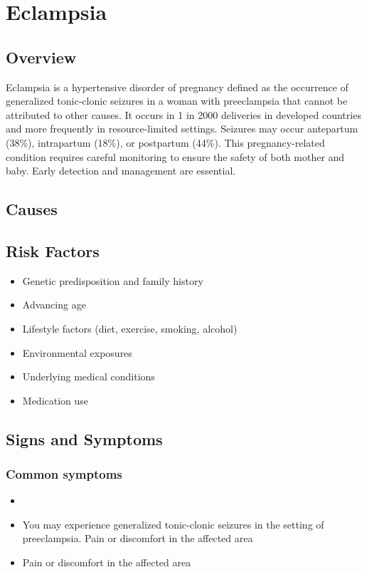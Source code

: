 \chapter{Eclampsia}
\label{sec:Eclampsia}

\section{Overview}
Eclampsia is a hypertensive disorder of pregnancy defined as the occurrence of generalized tonic-clonic seizures in a woman with preeclampsia that cannot be attributed to other causes. It occurs in 1 in 2000 deliveries in developed countries and more frequently in resource-limited settings. Seizures may occur antepartum (38\%), intrapartum (18\%), or postpartum (44\%). This pregnancy-related condition requires careful monitoring to ensure the safety of both mother and baby. Early detection and management are essential.
\section{Causes}
\section{Risk Factors}

\begin{itemize}[noitemsep]
  \item Genetic predisposition and family history
  \item Advancing age
  \item Lifestyle factors (diet, exercise, smoking, alcohol)
  \item Environmental exposures
  \item Underlying medical conditions
  \item Medication use
\end{itemize}
\section{Signs and Symptoms}

\subsection{Common symptoms}
\begin{itemize}[noitemsep]
  \item \item You may experience generalized tonic-clonic seizures in the setting of preeclampsia. Pain or discomfort in the affected area    \item Pain or discomfort in the affected area
  \end{itemize}


